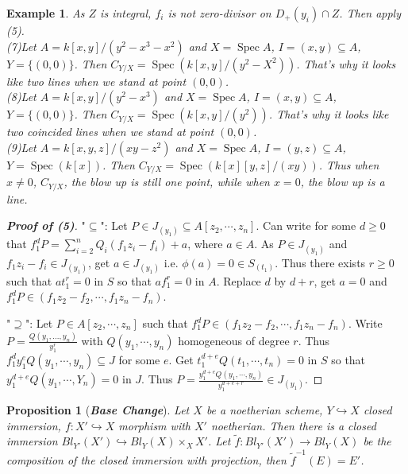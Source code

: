 \documentclass{ctexart}
\newtheorem{proposition}{Proposition}[section]
\newtheorem{example}{Example}[section]
\newcommand{\spec}{\operatorname{Spec}}
\begin{document}
\begin{example}
    As $Z$ is integral, $f_{i}$ is not zero-divisor on $D_{+}(y_{i}) \cap Z$.
    Then apply (5).
    \\
    (7)Let $A = k[x, y]/(y^{2} - x^{3} - x^{2})$ and $X = \spec A$, $I = (x, y) \subseteq A$, $Y = \{(0, 0)\}$.
    Then $C_{Y/X} = \spec(k[x, y]/(y^{2} - X^{2}))$.
    That's why it looks like two lines when we stand at point $(0, 0)$.
    \\
    (8)Let $A = k[x, y]/(y^{2} - x^{3})$ and $X= \spec A$, $I = (x, y) \subseteq A$, $Y = \{(0, 0)\}$.
    Then $C_{Y/X} = \spec(k[x, y]/(y^{2}))$.
    That's why it looks like two coincided lines when we stand at point $(0, 0)$.
    \\
    (9)Let $A = k[x, y, z]/(xy - z^{2})$ and $X = \spec A$, $I = (y, z) \subseteq A$, $Y = \spec(k[x])$.
    Then $C_{Y/X} = \spec(k[x][y, z]/(xy))$.
    Thus when $x \neq 0$, $C_{Y/X}$, the blow up is still one point, while when $x = 0$, the blow up is a line.
    \label{example:many_examples_about_blow_up}
\end{example}
\begin{proof}[\textbf{\emph{Proof of (5)}}]
    "$\subseteq$": Let $P\in J_{(y_{1})} \subseteq A[z_{2}, \cdots, z_{n}]$.
    Can write for some $d \ge 0$ that $f_{1}^{d}P = \sum_{i = 2}^{n} Q_{i}(f_{1}z_{i} - f_{i}) + a$, where $a\in A$.
    As $P\in J_{(y_{1})}$ and $f_{1}z_{i} - f_{i}\in J_{(y_{1})}$, get $a\in J_{(y_{1})}$ i.e. $\phi(a) = 0\in S_{(t_{1})}$.
    Thus there exists $r \ge 0$ such that $at_{1}^{r} = 0$ in $S$ so that $af_{1}^{r} = 0$ in $A$.
    Replace $d$ by $d + r$, get $a = 0$ and $f_{1}^{d}P\in (f_{1}z_{2} - f_{2}, \cdots, f_{1}z_{n} - f_{n})$.
    \par
    "$\supseteq$": Let $P\in A[z_{2}, \cdots, z_{n}]$ such that $f_{1}^{d}P\in (f_{1}z_{2} - f_{2}, \cdots, f_{1}z_{n} - f_{n})$.
    Write $P = \frac{Q(y_{1}, ..., y_{n})}{y_{1}^{r}}$ with $Q(y_{1}, \cdots, y_{n})$ homogeneous of degree $r$.
    Thus $f_{1}^{d}y_{1}^{e}Q(y_{1}, \cdots, y_{n})\subseteq J$ for some $e$.
    Get $t_{1}^{d + e}Q(t_{1}, \cdots, t_{n}) = 0$ in $S$ so that $y_{1}^{d + e}Q(y_{1}, \cdots, Y_{n}) = 0$ in $J$.
    Thus $P = \frac{y_{1}^{d + e}Q(y_{1}, \cdots, y_{n})}{y_{1}^{d + e + r}}\in J_{(y_{1})}$.
\end{proof}
\begin{proposition}[\textbf{\emph{Base Change}}]
    Let $X$ be a noetherian scheme, $Y \hookrightarrow X$ closed immersion, $f: X' \hookrightarrow X$ morphism with $X'$ noetherian.
    Then there is a closed immersion $Bl_{Y'}(X') \hookrightarrow Bl_{Y}(X) \times_{X} X'$.
    Let $\widetilde{f}: Bl_{Y'}(X') \longrightarrow Bl_{Y}(X)$ be the composition of the closed immersion with projection,
    then $\widetilde{f}^{-1}(E) = E'$.
    \label{Proposition 10.2}
\end{proposition}
\end{document}
